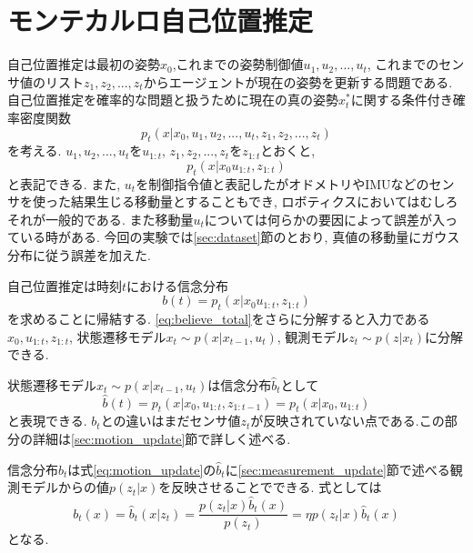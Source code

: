 \appendix
\chapter{モンテカルロ自己位置推定}\label{app:monte_carlo}
自己位置推定は最初の姿勢$x_{0}$,これまでの姿勢制御値$u_{1},u_{2}, ... ,u_{t}$, これまでのセンサ値のリスト$z_{1},z_{2}, ... ,z_{t}$からエージェントが現在の姿勢を更新する問題である. 自己位置推定を確率的な問題と扱うために現在の真の姿勢$x^{*}_{t}$に関する条件付き確率密度関数
\begin{equation}
    p_{t}(x|x_{0},u_{1},u_{2}, ... ,u_{t},z_{1},z_{2}, ... ,z_{t})
\end{equation}
を考える. $u_{1},u_{2}, ... ,u_{t}$を$u_{1:t}$, $z_{1},z_{2}, ... ,z_{t}$を$z_{1:t}$とおくと,
\begin{equation}
    p_{t}(x|x_{0}u_{1:t},z_{1:t})
\end{equation}
と表記できる. また, $u_{t}$を制御指令値と表記したがオドメトリやIMUなどのセンサを使った結果生じる移動量とすることもでき, ロボティクスにおいてはむしろそれが一般的である\cite{ueda_prob_robotics}. また移動量$u_{t}$については何らかの要因によって誤差が入っている時がある. 今回の実験では\ref{sec:dataset}節のとおり, 真値の移動量にガウス分布に従う誤差を加えた.\par 自己位置推定は時刻$t$における信念分布
\begin{equation}\label{eq:believe_total}
    b(t)=p_{t}(x|x_{0}u_{1:t},z_{1:t})
\end{equation}
を求めることに帰結する. \ref{eq:believe_total}をさらに分解すると入力である$x_{0},u_{1:t},z_{1:t}$, 状態遷移モデル$x_{t} \sim p(x|x_{t-1},u_{t})$, 観測モデル$z_{t} \sim p(z|x_{t})$に分解できる.\par 状態遷移モデル$x_{t} \sim p(x|x_{t-1},u_{t})$は信念分布$\hat{b}_{t}$として
\begin{equation}\label{eq:motion_update}
    \hat{b}(t)=p_{t}(x|x_{0},u_{1:t},z_{1:t-1})=p_{t}(x|x_{0},u_{1:t})
\end{equation}
と表現できる. $b_{t}$との違いはまだセンサ値$z_{t}$が反映されていない点である.この部分の詳細は\ref{sec:motion_update}節で詳しく述べる.\par 信念分布$b_{t}$は式\ref{eq:motion_update}の$\hat{b}_{t}$に\ref{sec:measurement_update}節で述べる観測モデルからの値$p(z_{t}|x)$を反映させることでできる. 式としては
\begin{equation}\label{eq:believe_equal}
    b_{t}(x)=\hat{b}_{t}(x|z_{t})=\frac{p(z_{t}|x)\hat{b}_{t}(x)}{p(z_{t})}=\eta p(z_{t}|x)\hat{b}_{t}(x)
\end{equation}
となる.




